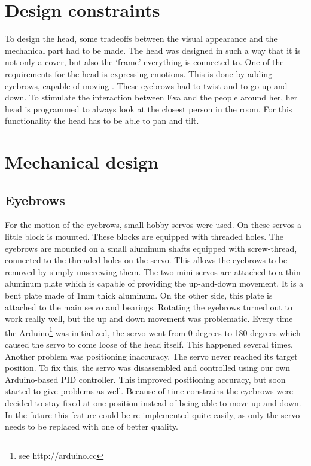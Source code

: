 \documentclass[technical_document.tex]{subfiles}
\begin{document}
\section{Design constraints}

To design the head, some tradeoffs between the visual appearance and the mechanical part had to be made. The head was designed in such a way that it is not only a cover, but also the ‘frame’ everything is connected to. One of the requirements for the head is expressing emotions. %
This is done by adding eyebrows, capable of moving . These eyebrows had to twist and to go up and down.  To stimulate the interaction between Eva and the people around her, her head is programmed to always look at the closest person in the room. For this functionality the head has to be able to pan and tilt.  %

\section{Mechanical design}

\subsection{Eyebrows}
For the motion of the eyebrows, small hobby servos were used. On these servos a little block is mounted. These blocks are equipped with threaded holes. The eyebrows are mounted on a small aluminum shafts equipped with screw-thread, connected to the threaded holes on the servo. This allows the eyebrows to be removed by simply unscrewing them. The two mini servos are attached to a thin aluminum plate which is capable of providing the up-and-down movement. It is a bent plate made of 1mm thick aluminum. On the other side, this plate is attached to the main servo and bearings. Rotating the eyebrows turned out to work really well, but the up and down movement was problematic. Every time the Arduino\footnote{see http://arduino.cc} was initialized, the servo went from 0 degrees to 180 degrees which caused the servo to come loose of the head itself. This happened several times. Another problem was positioning inaccuracy. The servo never reached its target position. To fix this, the servo was disassembled and controlled using our own Arduino-based PID controller. This improved positioning accuracy, but soon started to give problems as well. Because of time constrains the eyebrows were decided to stay fixed at one position instead of being able to move up and down. In the future this feature could be re-implemented quite easily, as only the servo needs to be replaced with one of better quality.
\end{document}
